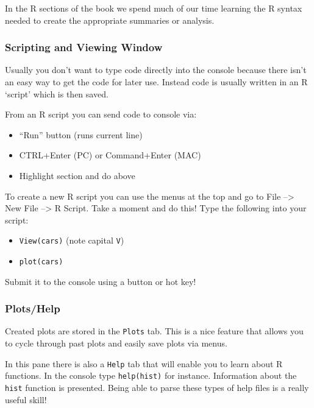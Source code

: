 \documentclass[
]{book}
\theoremstyle{definition}
\theoremstyle{definition}
\theoremstyle{definition}
\theoremstyle{remark}
\begin{document}
In the R sections of the book we spend much of our time learning the R syntax needed to create the appropriate summaries or analysis.

\hypertarget{scripting-and-viewing-window}{%
\subsubsection{Scripting and Viewing Window}\label{scripting-and-viewing-window}}

Usually you don't want to type code directly into the console because there isn't an easy way to get the code for later use. Instead code is usually written in an R `script' which is then saved.

From an R script you can send code to console via:

\begin{itemize}
\item
  ``Run'' button (runs current line)
\item
  CTRL+Enter (PC) or Command+Enter (MAC)
\item
  Highlight section and do above
\end{itemize}

To create a new R script you can use the menus at the top and go to File --\textgreater{} New File --\textgreater{} R Script. Take a moment and do this! Type the following into your script:

\begin{itemize}
\item
  \texttt{View(cars)} (note capital \texttt{V})
\item
  \texttt{plot(cars)}
\end{itemize}

Submit it to the console using a button or hot key!

\hypertarget{plotshelp}{%
\subsubsection{Plots/Help}\label{plotshelp}}

Created plots are stored in the \texttt{Plots} tab. This is a nice feature that allows you to cycle through past plots and easily save plots via menus.

In this pane there is also a \texttt{Help} tab that will enable you to learn about R functions. In the console type \texttt{help(hist)} for instance. Information about the \texttt{hist} function is presented. Being able to parse these types of help files is a really useful skill!
\end{document}
